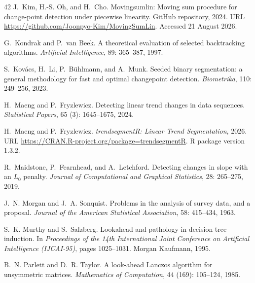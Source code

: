 \documentclass[12pt, a4paper]{article}
\begin{document}
\begin{thebibliography}{42}
J.~Kim, H.-S. Oh, and H.~Cho.
\newblock Movingsumlin: Moving sum procedure for change-point detection under
  piecewise linearity.
\newblock GitHub repository, 2024{}.
\newblock URL \url{https://github.com/Joonpyo-Kim/MovingSumLin}.
\newblock Accessed 21 August 2026.

G.~Kondrak and P.~van Beek.
\newblock A theoretical evaluation of selected backtracking algorithms.
\newblock \emph{Artificial Intelligence}, 89: 365--387, 1997.

S.~Kov\'{a}cs, H.~Li, P.~B\"{u}hlmann, and A.~Munk.
\newblock Seeded binary segmentation: a general methodology for fast and
  optimal changepoint detection.
\newblock \emph{Biometrika}, 110: 249--256, 2023.

H.~Maeng and P.~Fryzlewicz.
\newblock Detecting linear trend changes in data sequences.
\newblock \emph{Statistical Papers}, 65 (3): 1645--1675,
  2024.

H.~Maeng and P.~Fryzlewicz.
\newblock \emph{trendsegmentR: Linear Trend Segmentation}, 2026.
\newblock URL \url{https://CRAN.R-project.org/package=trendsegmentR}.
\newblock R package version 1.3.2.

R.~Maidstone, P.~Fearnhead, and A.~Letchford.
\newblock Detecting changes in slope with an {$L_0$} penalty.
\newblock \emph{Journal of Computational and Graphical Statistics},
  28: 265--275, 2019.

J.~N. Morgan and J.~A. Sonquist.
\newblock Problems in the analysis of survey data, and a proposal.
\newblock \emph{Journal of the American Statistical Association}, 58:
  415--434, 1963.

S.~K. Murthy and S.~Salzberg.
\newblock Lookahead and pathology in decision tree induction.
\newblock In \emph{Proceedings of the 14th International Joint Conference on
  Artificial Intelligence (IJCAI-95)}, pages 1025--1031. Morgan Kaufmann, 1995.

B.~N. Parlett and D.~R. Taylor.
\newblock A look-ahead {L}anczos algorithm for unsymmetric matrices.
\newblock \emph{Mathematics of Computation}, 44 (169):
  105--124, 1985.


\end{thebibliography}
\end{document}
